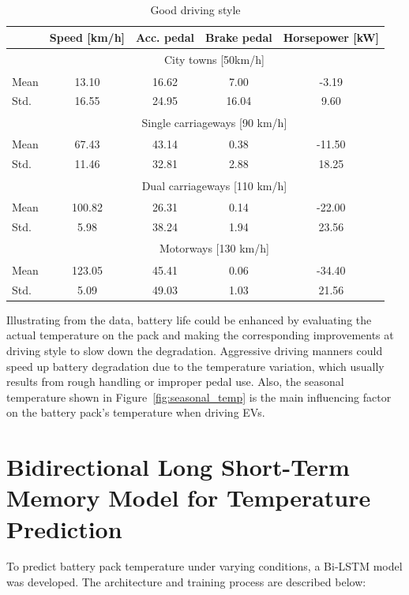 \begin{table}[!ht]
    \centering
    \caption{Good driving style}
        \begin{tabular}{l|c|c|c|c}
        \label{table:good_driving_style}
        ~ & Speed [km/h] & Acc. pedal & Brake pedal & Horsepower [kW]\\ \hline
        ~ & \multicolumn{4}{c}{\multirow{2}{*}{City towns [50km/h]}} \\\\ \hline
        Mean & 13.10 & 16.62 & 7.00 & -3.19\\
        Std. & 16.55 & 24.95 & 16.04 &9.60\\ \hline
        ~ & \multicolumn{4}{c}{\multirow{2}{*}{Single carriageways [90 km/h]}} \\\\ \hline
        Mean & 67.43 & 43.14 & 0.38 & -11.50\\
        Std. & 11.46 & 32.81 & 2.88 & 18.25\\ \hline
        ~ & \multicolumn{4}{c}{\multirow{2}{*}{Dual carriageways [110 km/h]}} \\\\ \hline
        Mean & 100.82 & 26.31 & 0.14 & -22.00\\
        Std. & 5.98 & 38.24 & 1.94 & 23.56\\ \hline
        ~ & \multicolumn{4}{c}{\multirow{2}{*}{Motorways [130 km/h]}} \\\\ \hline
        Mean & 123.05 & 45.41 & 0.06 & -34.40\\
        Std. & 5.09 & 49.03 & 1.03 & 21.56\\
        \hline
        \end{tabular}
\end{table}

Illustrating from the data, battery life could be enhanced by evaluating the actual temperature on the pack and making the corresponding improvements at driving style to slow down the degradation. 
Aggressive driving manners could speed up battery degradation due to the temperature variation, which usually results from rough handling or improper pedal use. 
Also, the seasonal temperature shown in Figure~\ref{fig:seasonal_temp} is the main influencing factor on the battery pack's temperature when driving \glspl{EV}.

\section{Bidirectional Long Short-Term Memory Model for Temperature Prediction}
To predict battery pack temperature under varying conditions, a \gls{Bi-LSTM} model was developed. The architecture and training process are described below:

